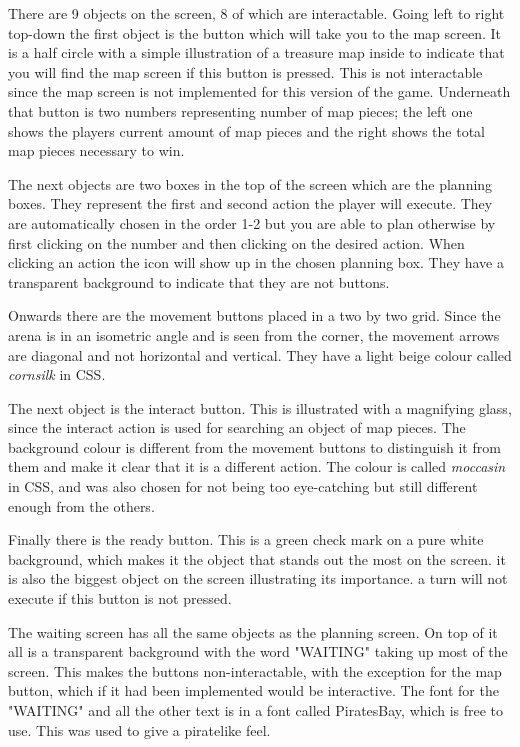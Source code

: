 There are 9 objects on the screen, 8 of which are interactable.
Going left to right top-down the first object is the button which will take you to the map screen. It is a half circle with a simple illustration of a treasure map inside to indicate that you will find the map screen if this button is pressed. This is not interactable since the map screen is not implemented for this version of the game. Underneath that button is two numbers representing number of map pieces; the left one shows the players current amount of map pieces and the right shows the total map pieces necessary to win.

The next objects are two boxes in the top of the screen which are the planning boxes. They represent the first and second action the player will execute. They are automatically chosen in the order 1-2 but you are able to plan otherwise by first clicking on the number and then clicking on the desired action. When clicking an action the icon will show up in the chosen planning box. They have a transparent background to indicate that they are not buttons. 

Onwards there are the movement buttons placed in a two by two grid. Since the arena is in an isometric angle and is seen from the corner, the movement arrows are diagonal and not horizontal and vertical. They have a light beige colour called \textit{cornsilk} in CSS. 

The next object is the interact button. This is illustrated with a magnifying glass, since the interact action is used for searching an object of map pieces. The background colour is different from the movement buttons to distinguish it from them and make it clear that it is a different action. The colour is called \textit{moccasin} in CSS, and was also chosen for not being too eye-catching but still different enough from the others. 

Finally there is the ready button. This is a green check mark on a pure white background, which makes it the object that stands out the most on the screen. it is also the biggest object on the screen illustrating its importance. a turn will not execute if this button is not pressed. 

The waiting screen has all the same objects as the planning screen. On top of it all is a transparent background with the word "WAITING" taking up most of the screen. This makes the buttons non-interactable, with the exception for the map button, which if it had been implemented would be interactive. The font for the "WAITING" and all the other text is in a font called PiratesBay, which is free to use. This was used to give a piratelike feel.
